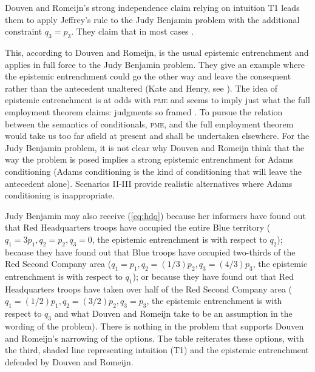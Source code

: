 \documentclass[phd,12pt,oneside]{ubcthesis}
\begin{document}
Douven and Romeijn's strong independence claim relying on intuition T1
leads them to apply Jeffrey's rule to the Judy Benjamin problem with
the additional constraint $q_{3}=p_{3}$. They claim that in most cases
.

This, according to Douven and Romeijn, is the usual epistemic
entrenchment and applies in full force to the Judy Benjamin problem.
They give an example where the epistemic entrenchment could go the
other way and leave the consequent rather than the antecedent
unaltered (Kate and Henry, see ). The
idea of epistemic entrenchment is at odds with \textsc{pme} and
seems to imply just what the full employment theorem claims: judgments
so framed  . To pursue the
relation between the semantics of conditionals, \textsc{pme}, and
the full employment theorem would take us too far afield at present
and shall be undertaken elsewhere. For the Judy Benjamin problem, it
is not clear why Douven and Romeijn think that the way the problem is
posed implies a strong epistemic entrenchment for Adams conditioning
(Adams conditioning is the kind of conditioning that will leave the
antecedent alone). Scenarios II-III provide realistic alternatives
where Adams conditioning is inappropriate.

Judy Benjamin may also receive ({\ref{eq:hdq}}) because her informers
have found out that Red Headquarters troops have occupied the entire
Blue territory ($q_{1}=3p_{1},q_{2}=p_{2},q_{3}=0$, the epistemic
entrenchment is with respect to $q_{2}$); because they have found out
that Blue troops have occupied two-thirds of the Red Second Company
area ($q_{1}=p_{1},q_{2}=(1/3)p_{2},q_{3}=(4/3)p_{3}$, the epistemic
entrenchment is with respect to $q_{1}$); or because they have found
out that Red Headquarters troops have taken over half of the Red
Second Company area ($q_{1}=(1/2)p_{1},q_{2}=(3/2)p_{2},q_{3}=p_{3}$,
the epistemic entrenchment is with respect to $q_{3}$ and what Douven
and Romeijn take to be an assumption in the wording of the problem).
There is nothing in the problem that supports Douven and Romeijn's
narrowing of the options. The table reiterates these options, with the
third, shaded line representing intuition (T1) and the epistemic
entrenchment defended by Douven and Romeijn.
\end{document}
